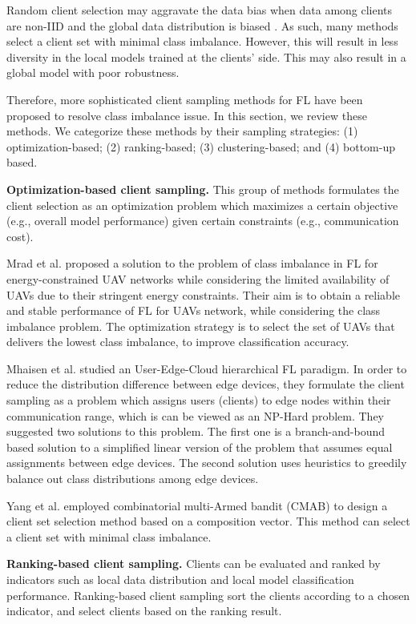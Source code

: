\documentclass[10pt,journal,compsoc]{IEEEtran}
\begin{document}
Random client selection may aggravate the data bias when data among clients are non-IID and the global data distribution is biased \cite{zhang2021dubhe}. As such, many methods select a client set with minimal class imbalance. However, this will result in less diversity in the local models trained at the clients' side. This may also result in a global model with poor robustness. 

Therefore, more sophisticated client sampling methods for FL have been proposed to resolve class imbalance issue. In this section, we review these methods. We categorize these methods by their sampling strategies: (1) optimization-based; (2) ranking-based; (3) clustering-based; and (4) bottom-up based. 

\textbf{Optimization-based client sampling.} This group of methods formulates the client selection as an optimization problem which maximizes a certain objective (e.g., overall model performance) given certain constraints (e.g., communication cost). 

Mrad et al. \cite{mrad2021federated} proposed a solution to the problem of class imbalance in FL for energy-constrained UAV networks while considering the limited availability of UAVs due to their stringent energy constraints. Their aim is to obtain a reliable and stable performance of FL for UAVs network, while considering the class imbalance problem. The optimization strategy is to select the set of UAVs that delivers the lowest class imbalance, to improve classification accuracy.

Mhaisen et al. \cite{mhaisen2021optimal} studied an User-Edge-Cloud hierarchical FL paradigm. In order to reduce the distribution difference between edge devices, they formulate the client sampling as a problem which assigns users (clients) to edge nodes within their communication range, which is can be viewed as an NP-Hard problem. They suggested two solutions to this problem. The first one is a branch-and-bound based solution to a simplified linear version of the problem that assumes equal assignments between edge devices. The second solution uses heuristics to greedily balance out class distributions among edge devices. 

Yang et al. \cite{yang2021federated} employed combinatorial multi-Armed bandit (CMAB) \cite{chen2013combinatorial} to design a client set selection method based on a composition vector. This method can select a client set with minimal class imbalance. 

\textbf{Ranking-based client sampling.} Clients can be evaluated and ranked by indicators such as local data distribution and local model classification performance. Ranking-based client sampling sort the clients according to a chosen indicator, and select clients based on the ranking result.
\end{document}
